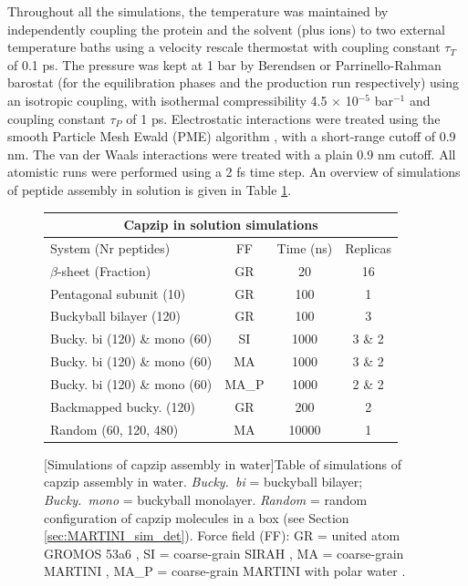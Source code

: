 Throughout all the simulations, the temperature was maintained by independently coupling the protein and the solvent (plus ions) to two external temperature baths using a velocity rescale thermostat \citep{Bussi2007} with coupling constant $\tau _T$ of 0.1 ps. The pressure was kept at 1 bar by Berendsen \citep{Berendsen1984} or Parrinello-Rahman barostat \citep{Parrinello1981} (for the equilibration phases and the production run respectively) using an isotropic coupling, with isothermal compressibility 4.5 $\times$ 10$^{-5}$ bar$^{-1}$ and coupling constant $\tau_P$ of 1 ps. Electrostatic interactions were treated using the smooth Particle Mesh Ewald (PME) algorithm \citep{Essmann1995}, with a short-range cutoff of 0.9 nm. The van der Waals interactions were treated with a plain 0.9 nm cutoff. All atomistic runs were performed using a 2 fs time step. An overview of simulations of peptide assembly in solution is given in Table \ref{table:sim_solution}.

\begin{figure}[t]
\centering
 \def\arraystretch{1.6}
\begin{tabular}{l|ccc}
 \multicolumn{4}{c}{\textbf{Capzip in solution simulations}} \\
 \hline
 System (Nr peptides) & FF & Time (ns) & Replicas \\
 \hline
 $\beta$-sheet (Fraction) & GR & 20 & 16 \\
 Pentagonal subunit (10) & GR & 100 & 1 \\
 Buckyball bilayer (120) & GR & 100 & 3 \\
 Bucky. bi (120) \& mono (60) & SI & 1000 & 3 \& 2 \\
 Bucky. bi (120) \& mono (60) & MA & 1000 & 3 \& 2 \\
 Bucky. bi (120) \& mono (60) & MA\_P & 1000 & 2 \& 2 \\
 Backmapped bucky. (120) & GR & 200 & 2 \\
 Random (60, 120, 480) & MA & 10000 & 1 \\
 \hline
 \end{tabular}
[Simulations of capzip assembly in water]{Table of simulations of capzip assembly in water. \emph{Bucky.\ bi} = buckyball bilayer; \emph{Bucky.\ mono} = buckyball monolayer. \emph{Random} = random configuration of capzip molecules in a box (see Section \ref{sec:MARTINI_sim_det}). Force field (FF): GR = united atom GROMOS 53a6 \citep{Oostenbrink2004}, SI = coarse-grain SIRAH \citep{Machado2018}, MA = coarse-grain MARTINI \citep{Marrink2007, Monticelli2008}, MA\_P = coarse-grain MARTINI with polar water \citep{Yesylevskyy2010}.}
\label{table:sim_solution}
\end{figure}

